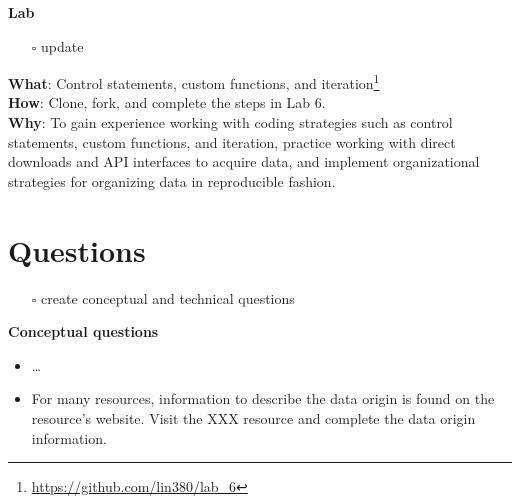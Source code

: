 \documentclass[
  letterpaper,
  DIV=11,
  numbers=noendperiod]{scrreport}
\providecommand{\tightlist}{%
  \setlength{\itemsep}{0pt}\setlength{\parskip}{0pt}}\usepackage{longtable,booktabs,array}
\theoremstyle{definition}
\theoremstyle{remark}
\DeclareRobustCommand{\href}[2]{#2\footnote{\url{#1}}}
\begin{document}
\begin{tcolorbox}[enhanced jigsaw, breakable, rightrule=.15mm, arc=.35mm, left=2mm, opacityback=0, leftrule=.75mm, toprule=.15mm, bottomrule=.15mm, colback=white]

\textbf{ Lab}

\begin{itemize}
\tightlist
\item[$\square$]
   update
\end{itemize}

\textbf{What}: \href{https://github.com/lin380/lab_6}{Control
statements, custom functions, and iteration}\\
\textbf{How}: Clone, fork, and complete the steps in Lab 6.\\
\textbf{Why}: To gain experience working with coding strategies such as
control statements, custom functions, and iteration, practice working
with direct downloads and API interfaces to acquire data, and implement
organizational strategies for organizing data in reproducible fashion.

\end{tcolorbox}

\hypertarget{questions-4}{%
\section*{Questions}\label{questions-4}}


\begin{itemize}
\tightlist
\item[$\square$]
   create conceptual and technical questions
\end{itemize}

\begin{tcolorbox}[enhanced jigsaw, breakable, rightrule=.15mm, arc=.35mm, left=2mm, opacityback=0, leftrule=.75mm, toprule=.15mm, bottomrule=.15mm, colback=white]

\textbf{Conceptual questions}

\begin{itemize}
\tightlist
\item
  \ldots{}
\item
  For many resources, information to describe the data origin is found
  on the resource's website. Visit the XXX resource and complete the
  data origin information.
\end{itemize}

\end{tcolorbox}
\end{document}
